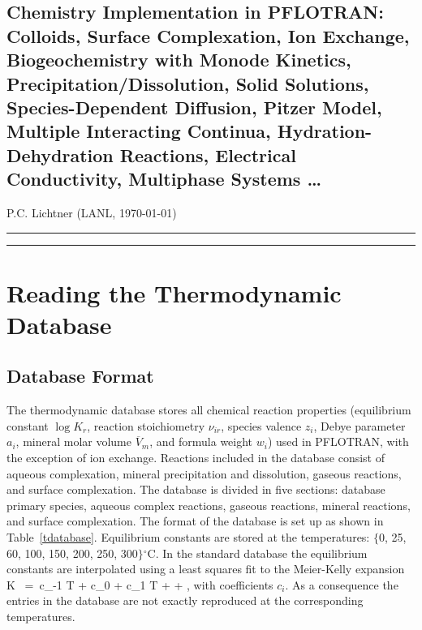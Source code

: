 \documentclass[12pt]{article}
\def\EQ#1\EN{\begin{equation}#1\end{equation}}
\newcommand{\bcr}{\begin{center}}
\newcommand{\ecr}{\end{center}}
\newcommand{\eq}{\ =\ }
\newcommand{\degc}{$^\circ$C}
\newcommand{\longline}{\noindent\rule[-0.1in]{\textwidth}{0.01in}}
\begin{document}
\bcr

\section*{Chemistry Implementation in PFLOTRAN: Colloids, Surface Complexation, Ion Exchange, Biogeochemistry with Monode Kinetics, Precipitation/Dissolution, Solid Solutions, Species-Dependent Diffusion, Pitzer Model, Multiple Interacting Continua, Hydration-Dehydration Reactions, Electrical Conductivity, Multiphase Systems \ldots}

P.C. Lichtner (LANL, \today)

\ecr

\longline

\tableofcontents

\longline

\section{Reading the Thermodynamic Database}

\setcounter{equation}{0}

\subsection{Database Format}

The thermodynamic database stores all chemical reaction properties (equilibrium constant $\log K_r$, reaction stoichiometry $\nu_{ir}$, species valence $z_i$, Debye parameter $a_i$, mineral molar volume $\overline V_m$, and formula weight $w_i$) used in PFLOTRAN, with the exception of ion exchange. Reactions included in the database consist of aqueous complexation, mineral precipitation and dissolution, gaseous reactions, and surface complexation. The database is divided in five sections: database primary species, aqueous complex reactions, gaseous reactions, mineral reactions, and surface complexation. The format of the database is set up as shown in Table~\ref{tdatabase}. Equilibrium constants are stored at the temperatures: $\{$0, 25, 60, 100, 150, 200, 250, 300$\}$\degc. In the standard database the equilibrium constants are interpolated using a least squares fit to the Meier-Kelly expansion
\EQ
\log K \eq c_{-1} \ln T + c_0 + c_1 T +  + ,
\EN
with coefficients $c_i$. As a consequence the entries in the database are not exactly reproduced at the corresponding temperatures. 
\end{document}
